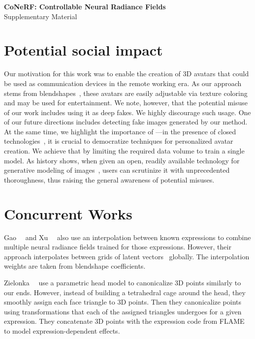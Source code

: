 {
\vspace{2.0em}
\centering
\Large
\textbf{CoNeRF: Controllable Neural Radiance Fields} \\
\vspace{0.5em}
 Supplementary Material \\ \vspace{1.0em} }

 \section{Potential social impact} Our motivation for this work was to enable
 the creation of 3D avatars that could be used as communication devices in the
 remote working era.
  As our approach stems from blendshapes~\cite{lewis2014practice}, these
  avatars are easily adjustable via texture coloring and may be used for
  entertainment.
  We note, however, that the potential misuse of our work includes using it as
  deep fakes.
  We highly discourage such usage.
  One of our future directions includes detecting fake images generated by our
  method.
  At the same time, we highlight the importance of \blendfields---in the
  presence of closed technologies~\cite{ma2021pixel,cao2022authentic}, it is
  crucial to democratize techniques for personalized avatar creation.
  We achieve that by limiting the required data volume to train a single
  model.
  As history shows, when given an open, readily available technology for
  generative modeling of images~\cite{rombach2022high}, users can scrutinize
  it with unprecedented thoroughness, thus raising the general awareness of
  potential misuses.

\section{Concurrent Works}
  Gao~\etal~\cite{gao2022reconstructing} and Xu~\etal~\cite{xu2022manvatar}
  also use an interpolation between known expressions to combine multiple
  neural radiance fields trained for those expressions.
  However, their approach interpolates between grids of latent
  vectors~\cite{mueller2022instant} globally.
  The interpolation weights are taken from blendshape coefficients.

  Zielonka~\etal~\cite{zielonka2022instant} use a parametric head model to
  canonicalize 3D points similarly to our ends.
  However, instead of building a tetrahedral cage around the head, they
  smoothly assign each face triangle to 3D points.
  Then they canonicalize points using transformations that each of the
  assigned triangles undergoes for a given expression.
  They concatenate 3D points with the expression code from
  FLAME~\cite{li2017flame} to model expression-dependent effects.

